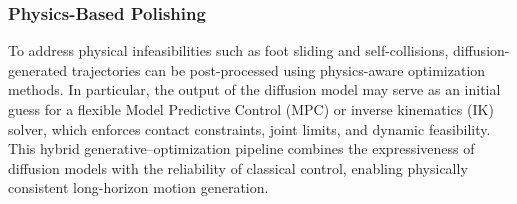 \subsubsection{Physics-Based Polishing}
To address physical infeasibilities such as foot sliding and self-collisions, diffusion-generated trajectories can be post-processed using physics-aware optimization methods. In particular, the output of the diffusion model may serve as an initial guess for a flexible Model Predictive Control (MPC) or inverse kinematics (IK) solver, which enforces contact constraints, joint limits, and dynamic feasibility. This hybrid generative--optimization pipeline combines the expressiveness of diffusion models with the reliability of classical control, enabling physically consistent long-horizon motion generation.
